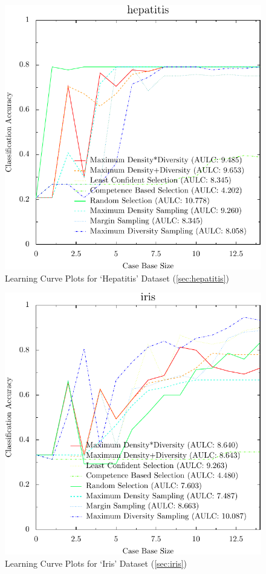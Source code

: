 \documentclass[a4paper,11pt]{report}
\begin{document}
\begin{figure}[h!]
\includegraphics{./Plots/hepatitis}
\caption{Learning Curve Plots for `Hepatitis' Dataset (\ref{sec:hepatitis})}
\end{figure}

\begin{figure}[h!]
\includegraphics{./Plots/iris}
\caption{Learning Curve Plots for `Iris' Dataset (\ref{sec:iris})}
\end{figure}
\end{document}
